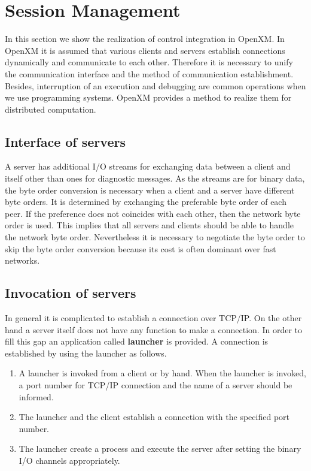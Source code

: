 
\section{Session Management}
\label{secsession}
 
In this section we show the realization of control integration in
OpenXM.  In OpenXM it is assumed that various clients and servers
establish connections dynamically and communicate to each
other. Therefore it is necessary to unify the communication interface
and the method of communication establishment.  Besides, interruption
of an execution and debugging are common operations when we use
programming systems. OpenXM provides a method to realize them for
distributed computation.

\subsection{Interface of servers}

A server has additional I/O streams for exchanging data between
a client and itself other than ones for diagnostic
messages. As the streams are for binary data,
the byte order conversion is necessary when a
client and a server have different byte orders. It is determined by
exchanging the preferable byte order of each peer. If the preference
does not coincides with each other,
then the network byte order is used.
This implies that all servers and clients should be able to
handle the network byte
order. Nevertheless it is necessary to negotiate the byte order to
skip the byte order conversion because its cost is often dominant over
fast networks.

\subsection{Invocation of servers}
\label{launcher}

In general it is complicated to establish a connection over TCP/IP.
On the other hand a server itself does not have any function to
make a connection. In order to fill this gap an application called
{\bf launcher} is provided. A connection is established by using
the launcher as follows.

\begin{enumerate}
\item A launcher is invoked from a client or by hand.
When the launcher is invoked, a port number for TCP/IP connection
and the name of a server should be informed.
\item The launcher and the client establish a connection with the
specified port number.
\item The launcher create a process and execute the server after
setting the binary I/O channels appropriately.
\end{enumerate}

